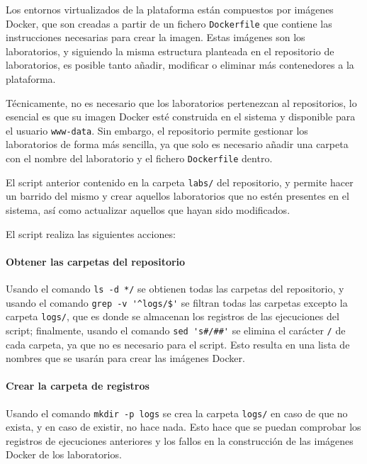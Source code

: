             Los entornos virtualizados de la plataforma están compuestos por imágenes Docker, que son creadas a partir de un fichero \texttt{Dockerfile} que contiene las instrucciones necesarias para crear la imagen. Estas imágenes son los laboratorios, y siguiendo la misma estructura planteada en el repositorio de laboratorios, es posible tanto añadir, modificar o eliminar más contenedores a la plataforma.

            Técnicamente, no es necesario que los laboratorios pertenezcan al repositorios, lo esencial es que su imagen Docker esté construida en el sistema y disponible para el usuario \texttt{www-data}. Sin embargo, el repositorio permite gestionar los laboratorios de forma más sencilla, ya que solo es necesario añadir una carpeta con el nombre del laboratorio y el fichero \texttt{Dockerfile} dentro.

            El script anterior contenido en la carpeta \texttt{labs/} del repositorio, y permite hacer un barrido del mismo y crear aquellos laboratorios que no estén presentes en el sistema, así como actualizar aquellos que hayan sido modificados.
            
            El script realiza las siguientes acciones:

            \paragraph{Obtener las carpetas del repositorio}
            
                Usando el comando \verb|ls -d */| se obtienen todas las carpetas del repositorio, y usando el comando \verb|grep -v '^logs/$'| se filtran todas las carpetas excepto la carpeta \texttt{logs/}, que es donde se almacenan los registros de las ejecuciones del script; finalmente, usando el comando \verb|sed 's#/##'| se elimina el carácter \texttt{/} de cada carpeta, ya que no es necesario para el script. Esto resulta en una lista de nombres que se usarán para crear las imágenes Docker.

            \paragraph{Crear la carpeta de registros}

                Usando el comando \texttt{mkdir -p logs} se crea la carpeta \texttt{logs/} en caso de que no exista, y en caso de existir, no hace nada. Esto hace que se puedan comprobar los registros de ejecuciones anteriores y los fallos en la construcción de las imágenes Docker de los laboratorios.

